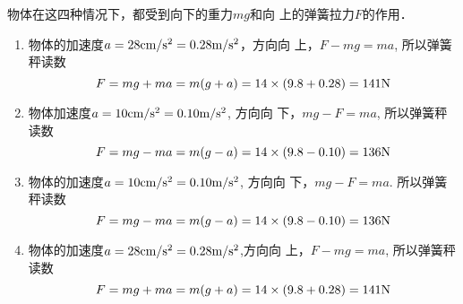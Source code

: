 \begin{enumerate}
\begin{solution}
    物体在这四种情况下，都受到向下的重力$mg$和向
上的弹簧拉力$F$的作用．
\begin{enumerate}
    \item 物体的加速度$a=28{\rm cm/s^2}=0.28\text{m}/\text{s}^2$，方向向
    上，$F-mg=ma$, 所以弹簧秤读数
   \[ F=mg+ma=m(g+a)=14\times(9.8+0.28)=141{\rm N}\]
    \item 物体加速度$a=10{\rm cm/s^2}=0.10\text{m}/\text{s}^2$, 方向向
    下，$mg-F=ma$, 所以弹簧秤读数
\[    F=mg-ma=m(g-a)=14\times(9.8-0.10)=136{\rm N}\]
    \item 物体的加速度$a=10{\rm cm/s^2}=0.10\text{m}/\text{s}^2$, 方向向
    下，$mg-F=ma$. 所以弹簧秤读数
    \[     F=mg- ma=m(g-a)=14\times(9.8-0.10)=136{\rm N}\]
    \item 物体的加速度$a=28{\rm cm/s^2}=0.28\text{m}/\text{s}^2$,方向向
    上，$F-mg=ma$, 所以弹簧秤读数
    \[     F=mg+ma=m(g+a)=14\times(9.8+0.28)=141{\rm N}\]
\end{enumerate}
\end{solution}
\end{enumerate}


